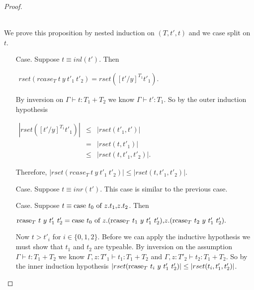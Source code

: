\begin{proof}
\begin{itemize}
  \ \\
  We prove this proposition by nested induction on $(T, t', t)$ and we case split on $t$.
  \begin{itemize}
  \item[Case.] Suppose $t \equiv inl(t')$.  Then
    \begin{center}
      \begin{math}
        \begin{array}{lll}
          rset(rcase_{T}\ t\ y\ t'_1\ t'_2) = rset([t'/y]^{T_1} t'_1).
        \end{array}
      \end{math}
    \end{center}
    By inversion on $\Gamma \vdash t:T_1+T_2$ we know $\Gamma \vdash t':T_1$.  So by the outer induction
    hypothesis 
    \begin{center}
      \begin{math}
        \begin{array}{lll}
          |rset([t'/y]^{T_1}t'_1)| & \leq & |rset(t'_1,t')|\\
          & =    & |rset(t,t'_1)|\\
          & \leq & |rset(t,t'_1,t'_2)|.
        \end{array}
      \end{math}
    \end{center}
    Therefore, $|rset(rcase_{T}\ t\ y\ t'_1\ t'_2)| \leq |rset(t,t'_1,t'_2)|$.

  \item[Case.] Suppose $t \equiv inr(t')$.  This case is similar to the previous case.

  \item[Case.] Suppose $t \equiv \mbox{case}\ t_0\ \text{of}\ z\text{.}t_1\text{,}z\text{.}t_2$.  Then
    \begin{center}
      \begin{math}
        \mbox{rcase}_{T}\ t\ y\ t'_1\ t'_2 = 
        \mbox{case}\ t_0\ \text{of}\ z\text{.}(\mbox{rcase}_{T}\ t_1\ y\ t'_1\ t'_2)\text{,}z\text{.}(\mbox{rcase}_{T}\ t_2\ y\ t'_1\ t'_2).
      \end{math}
    \end{center}
    Now $t > t'_i$ for $i \in \{0,1,2\}$. Before we can apply the inductive hypothesis we must show that $t_1$ and $t_2$ 
    are typeable.  By inversion on the assumption $\Gamma \vdash t:T_1+T_2$ we know 
    $\Gamma,z:T'_1 \vdash t_1:T_1+T_2$ and $\Gamma,z:T'_2 \vdash t_2:T_1+T_2$.  So by the inner induction 
    hypothesis $|rset(\mbox{rcase}_{T}\ t_i\ y\ t'_1\ t'_2)| \leq |rset(t_i,t'_1,t'_2)|$.
        

\end{itemize}
\end{itemize}
\end{proof}
